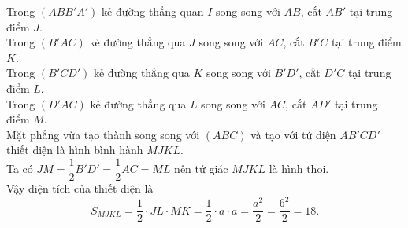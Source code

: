 \begin{ex}
{		Trong $\left(ABB'A'\right)$ kẻ đường thẳng quan $I$ song song với $AB$, cắt $AB'$ tại trung điểm  $J$.\\
		Trong $\left(B'AC\right)$ kẻ đường thẳng qua $J$ song song với $AC$, cắt  $B'C$ tại trung điểm $K$.\\
		Trong $\left(B'CD'\right)$ kẻ đường thẳng qua $K$ song song với  $B'D'$, cắt $D'C$ tại trung điểm $L$.\\
		Trong $\left(D'AC\right)$ kẻ đường thẳng qua $L$ song song với $AC$, cắt $AD'$  tại trung điểm $M$.\\
		Mặt phẳng vừa tạo thành  song song với $\left(ABC\right)$ và tạo với tứ diện $AB'CD'$ thiết diện là hình bình hành $MJKL$.\\
		 Ta có
		$JM=\dfrac{1}{2}B'D'=\dfrac{1}{2}AC=ML$ nên tứ giác  $MJKL$ là hình thoi.\\
	Vậy diện tích của thiết diện là $$S_{MJKL}=\dfrac{1}{2}\cdot JL\cdot MK=\dfrac{1}{2}\cdot a\cdot a=\dfrac{a^2}{2}=\dfrac{6^2}{2}=18.$$} 
\end{ex}

